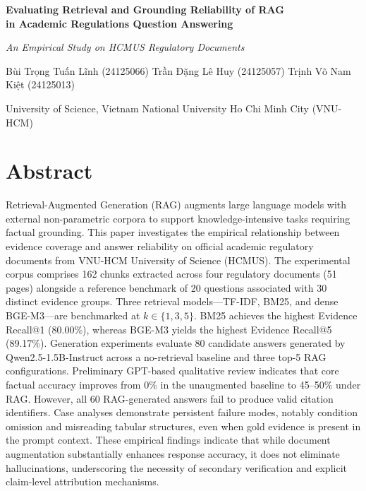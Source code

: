 \documentclass[12pt,a4paper]{article}
\begin{document}
\begin{center}
{\LARGE\bfseries Evaluating Retrieval and Grounding Reliability of RAG\\[3pt]
in Academic Regulations Question Answering\par}
\vspace{4pt}
{\itshape An Empirical Study on HCMUS Regulatory Documents\par}
\vspace{5pt}
{\small Bùi Trọng Tuấn Lĩnh (24125066) \textperiodcentered{} Trần Đặng Lê Huy (24125057) \textperiodcentered{} Trịnh Võ Nam Kiệt (24125013)\par}
\vspace{2pt}
{\footnotesize University of Science, Vietnam National University Ho Chi Minh City (VNU-HCM)\par}
\end{center}

\section*{Abstract}

Retrieval-Augmented Generation (RAG) augments large language models with external non-parametric corpora to support knowledge-intensive tasks requiring factual grounding. This paper investigates the empirical relationship between evidence coverage and answer reliability on official academic regulatory documents from VNU-HCM University of Science (HCMUS). The experimental corpus comprises 162 chunks extracted across four regulatory documents (51 pages) alongside a reference benchmark of 20 questions associated with 30 distinct evidence groups. Three retrieval models---TF-IDF, BM25, and dense BGE-M3---are benchmarked at $k \in \{1, 3, 5\}$. BM25 achieves the highest Evidence Recall@1 (80.00\%), whereas BGE-M3 yields the highest Evidence Recall@5 (89.17\%). Generation experiments evaluate 80 candidate answers generated by Qwen2.5-1.5B-Instruct across a no-retrieval baseline and three top-5 RAG configurations. Preliminary GPT-based qualitative review indicates that core factual accuracy improves from 0\% in the unaugmented baseline to 45--50\% under RAG. However, all 60 RAG-generated answers fail to produce valid citation identifiers. Case analyses demonstrate persistent failure modes, notably condition omission and misreading tabular structures, even when gold evidence is present in the prompt context. These empirical findings indicate that while document augmentation substantially enhances response accuracy, it does not eliminate hallucinations, underscoring the necessity of secondary verification and explicit claim-level attribution mechanisms.
\end{document}
